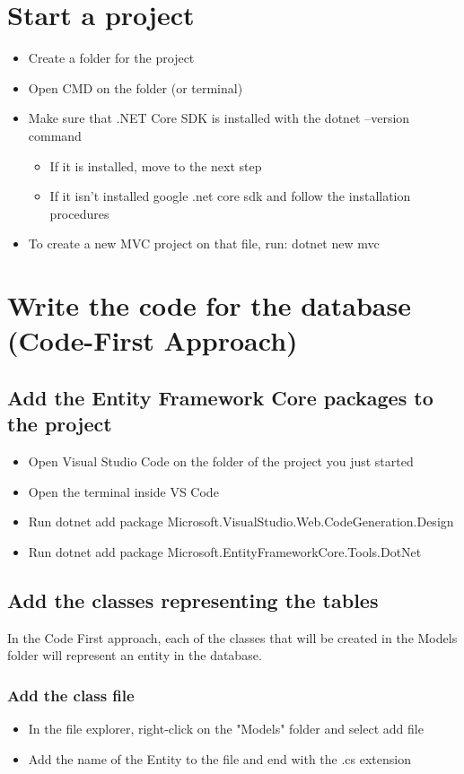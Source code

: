 \documentclass{report}
\begin{document}
    \chapter{Start a project}
    \begin{itemize}
        \item Create a folder for the project
        \item Open CMD on the folder (or terminal)
        \item Make sure that .NET Core SDK is installed with the dotnet --version command
        \begin{itemize}
            \item If it is installed, move to the next step
            \item If it isn't installed google .net core sdk and follow the installation procedures
        \end{itemize}
        \item To create a new MVC project on that file, run: dotnet new mvc
    \end{itemize}

    \chapter{Write the code for the database (Code-First Approach)}
    \section{Add the Entity Framework Core packages to the project}
    \begin{itemize}
        \item Open Visual Studio Code on the folder of the project you just started
        \item Open the terminal inside VS Code
        \item Run dotnet add package Microsoft.VisualStudio.Web.CodeGeneration.Design
        \item Run dotnet add package Microsoft.EntityFrameworkCore.Tools.DotNet
    \end{itemize}

    \section{Add the classes representing the tables}
    In the Code First approach, each of the classes that will be created in the Models
    folder will represent an entity in the database.
    \subsection{Add the class file}
    \begin{itemize}
        \item In the file explorer, right-click on the "Models" folder and select add file
        \item Add the name of the Entity to the file and end with the .cs extension
    \end{itemize}
\end{document}
